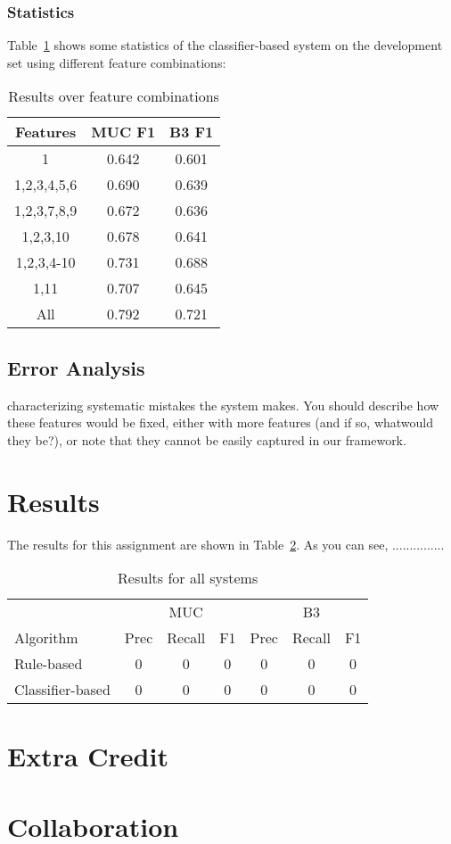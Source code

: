 \documentclass[12pt, twocolumn]{article}
\begin{document}
\subsubsection{Statistics}
Table~\ref{tab:features} shows some statistics of the classifier-based system on the development set using different feature combinations:
\begin{table}[H]
\begin{center}
\begin{tabular}{|c|c|c|}
\hline
Features & MUC F1 & B3 F1\\\hline
1 & 0.642 & 0.601 \\\hline
1,2,3,4,5,6 & 0.690 & 0.639\\\hline
1,2,3,7,8,9 & 0.672 & 0.636\\\hline
1,2,3,10 & 0.678 & 0.641 \\\hline
1,2,3,4-10 & 0.731 & 0.688 \\\hline
1,11 & 0.707 & 0.645 \\\hline
All & 0.792 & 0.721 \\\hline
\end{tabular}
\end{center}
\caption{Results over feature combinations}
\label{tab:features}
\end{table}
\subsection{Error Analysis}
characterizing systematic mistakes the system makes. You should describe how these features
would be fixed, either with more features (and if so, whatwould they be?), or note that they cannot be easily captured
in our framework.
\section{Results}
The results for this assignment are shown in Table~\ref{tab:results}. As you can see, ...............
\begin{table}[b]
\begin{minipage}{\textwidth}
\centering
\begin{tabular}{l|c c c|c c c}
\hline
& & MUC & & & B3 & \\
Algorithm & Prec & Recall & F1 & Prec & Recall & F1 \\\hline
Rule-based & 0 & 0 & 0 & 0 & 0 & 0\\\hline  
Classifier-based & 0 & 0 & 0 & 0 & 0 & 0\\\hline
\end{tabular}
\caption{Results for all systems}\label{tab:results}
\end{minipage}
\end{table}


\section{Extra Credit}

\section{Collaboration} 
\end{document}
